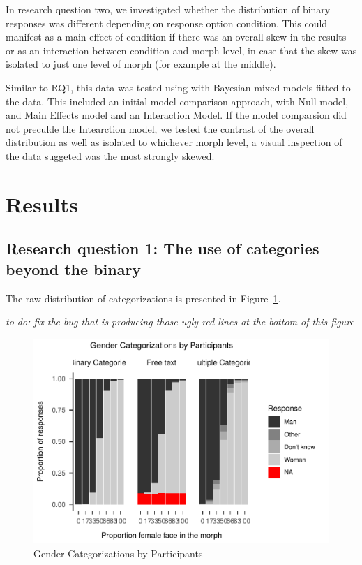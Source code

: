 \documentclass[
  man]{apa7}
\begin{document}
In research question two, we investigated whether the distribution of binary responses was different depending on response option condition. This could manifest as a main effect of condition if there was an overall skew in the results or as an interaction between condition and morph level, in case that the skew was isolated to just one level of morph (for example at the middle).

Similar to RQ1, this data was tested using with Bayesian mixed models fitted to the data. This included an initial model comparison approach, with Null model, and Main Effects model and an Interaction Model. If the model comparsion did not preculde the Intearction model, we tested the contrast of the overall distribution as well as isolated to whichever morph level, a visual inspection of the data suggeted was the most strongly skewed.

\hypertarget{results}{%
\section{Results}\label{results}}

\hypertarget{research-question-1-the-use-of-categories-beyond-the-binary-1}{%
\subsection{Research question 1: The use of categories beyond the binary}\label{research-question-1-the-use-of-categories-beyond-the-binary-1}}

The raw distribution of categorizations is presented in Figure~\ref{fig:descriptives}.

\emph{to do: fix the bug that is producing those ugly red lines at the bottom of this figure}

\begin{figure}
\centering
\includegraphics{resp_opts_manus23022_files/figure-latex/descriptives-1.pdf}
\caption{\label{fig:descriptives}Gender Categorizations by Participants}
\end{figure}
\end{document}
